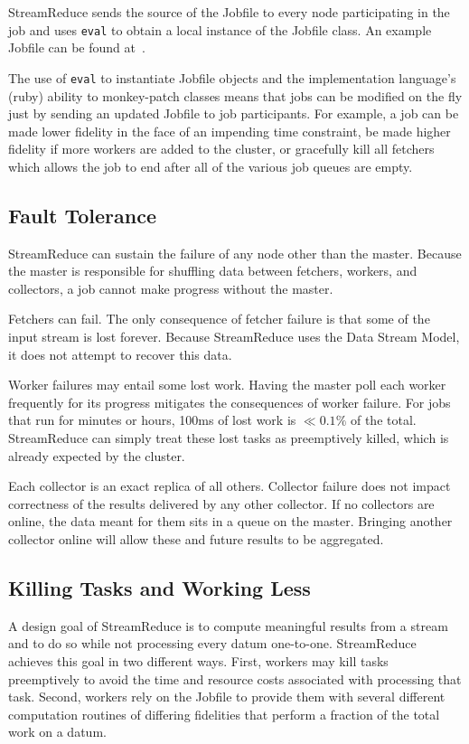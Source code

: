 \documentclass[12pt,twocolumn]{article}
\begin{document}
StreamReduce sends the source of the Jobfile to every node participating in the job and uses
\texttt{eval} to
obtain a local instance of the Jobfile class. An example Jobfile can be found at~\cite{github}.

The use of \texttt{eval} to instantiate Jobfile objects and the implementation language's
(ruby)
ability to monkey-patch classes means that jobs can be modified on the fly just by sending
an updated Jobfile to job participants. For example, a job can be made lower fidelity in
the face of an impending time constraint, be made higher fidelity if more workers are added
to
the cluster, or gracefully kill all fetchers which allows the job to end after all of the
various job queues are empty.
\subsection{Fault Tolerance}
StreamReduce can sustain the failure of any node other than the master. Because the master
is responsible
for shuffling data between fetchers, workers, and collectors, a job cannot make progress
without
the master.

Fetchers can fail. The only consequence of fetcher failure is that some of the input stream is
lost forever. Because StreamReduce uses the Data Stream Model, it does not attempt to
recover this data.

Worker failures may entail some lost work. Having the master poll each worker frequently for
its
progress mitigates the consequences of worker failure. For jobs that run for minutes or
hours,
100ms of lost work is $\ll0.1\%$ of the total. StreamReduce can simply treat these lost tasks
as preemptively
killed, which is already expected by the cluster.

Each collector is an exact replica of all others. Collector failure does not impact correctness
of
the results delivered by any other collector. If no collectors are online, the data meant for
them
sits in a queue on the master. Bringing another collector online will allow these and future
results
to be aggregated.
\subsection{Killing Tasks and Working Less}
A design goal of StreamReduce is to compute meaningful results from a stream and to do so
while not
processing every datum one-to-one. StreamReduce achieves this goal in two different ways.
First, workers
may kill tasks preemptively to avoid the time and resource costs associated with processing
that task. Second, workers rely on the Jobfile to provide them with several different
computation routines of differing fidelities that perform a fraction of the total work on a
datum.
\end{document}
